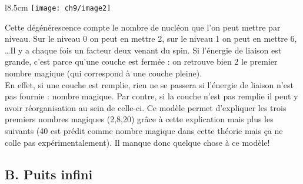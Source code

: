 	\begin{wrapfigure}[9]{l}{8.5cm}
	\vspace{-5mm}
	\texttt{[image: ch9/image2]}
	\end{wrapfigure}

Cette dégénérescence compte le nombre de nucléon que l'on peut mettre par niveau. Sur le niveau 0 on peut en
mettre 2, sur le niveau 1 on peut en mettre 6, \dots Il y a chaque fois un facteur deux venant du spin. Si
l'énergie de liaison est grande, c'est parce qu'une couche est fermée : on retrouve bien 2 le premier nombre 
magique (qui correspond à une couche pleine). \\

En effet, si une couche est remplie, rien ne se passera si l'énergie de liaison n'est pas fournie : nombre 
magique. Par contre, si la couche n'est pas remplie il peut y avoir réorganisation au sein de celle-ci. Ce 
modèle permet d'expliquer les trois premiers nombres magiques (2,8,20) grâce à cette explication mais plus les
suivants (40 est prédit comme nombre magique dans cette théorie mais ça ne colle pas expérimentalement). Il 
manque donc quelque chose à ce modèle!

\subsection{B. Puits infini}